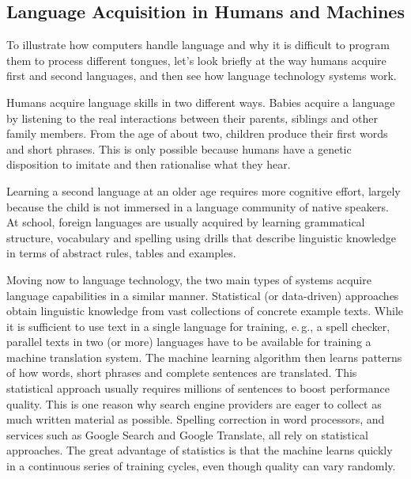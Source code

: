 \documentclass[]{../../metanetpaper}
\begin{document}
\begin{multicols}{2}

\subsection{Language Acquisition in Humans and Machines}

To illustrate how computers handle language and why it is difficult to program them to process different tongues, let’s look briefly at the way humans acquire first and second languages, and then see how language technology systems work.

Humans acquire language skills in two different ways. Babies acquire a language by listening to the real interactions between their parents, siblings and other family members. From the age of about two, children produce their first words and short phrases. This is only possible because humans have a genetic disposition to imitate and then rationalise what they hear. 

Learning a second language at an older age requires more cognitive effort, largely because the child is not immersed in a language community of native speakers. At school, foreign languages are usually acquired by learning grammatical structure, vocabulary and spelling using drills that describe linguistic knowledge in terms of abstract rules, tables and examples.


Moving now to language technology, the two main types of systems acquire language capabilities in a similar manner. Statistical (or data-driven) approaches obtain linguistic knowledge from vast collections of concrete example texts. While it is sufficient to use text in a single language for training, e.\,g., a spell checker, parallel texts in two (or more) languages have to be available for training a machine translation system. The machine learning algorithm then learns patterns of how words, short phrases and complete sentences are translated.
This statistical approach usually requires millions of sentences to boost performance quality. This is one reason why search engine providers are eager to collect as much written material as possible. Spelling correction in word processors, and services such as Google Search and Google Translate, all rely on statistical approaches. The great advantage of statistics is that the machine learns quickly in a continuous series of training cycles, even though quality can vary randomly.


\end{multicols}
\end{document}
